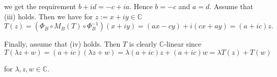 \begin{enumerate}[label = \textbf{Exercise \arabic*.},wide = 0pt, itemsep=1.5ex]
		\noindent we get the requirement $b + id = -c + ia$. Hence $b = -c$ and $a = d$. Assume that (iii) holds. Then we have for $z := x + iy \in \mathbb{C}$
		\begin{equation}
			T(z) = (\Phi_B \circ M_B(T) \circ \Phi_B^{-1})(x + iy) = (ax - cy) + i(cx + ay) = (a + ic)z.
		\end{equation}

		Finally, assume that (iv) holds. Then $T$ is clearly $\mathbb{C}$-linear since 
		\begin{equation}
			T(\lambda z + w) = (a + ic)(\lambda z + w) = \lambda(a + ic)z + (a + ic)w = \lambda T(z) + T(w)
		\end{equation}

		\noindent for $\lambda,z,w \in \mathbb{C}$.

\end{enumerate}
\printbibliography

